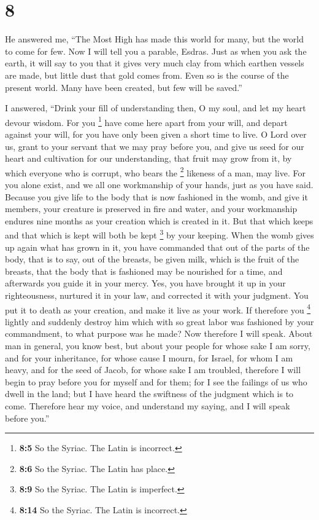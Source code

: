 \hypertarget{section-7}{%
\section{8}\label{section-7}}

 He answered me, ``The Most High has made this world for
many, but the world to come for few.  Now I will tell you
a parable, Esdras. Just as when you ask the earth, it will say to you
that it gives very much clay from which earthen vessels are made, but
little dust that gold comes from. Even so is the course of the present
world.  Many have been created, but few will be saved.''

 I answered, ``Drink your fill of understanding then, O my
soul, and let my heart devour wisdom.  For you \footnote{\textbf{8:5}
  So the Syriac. The Latin is incorrect.} have come here apart from your
will, and depart against your will, for you have only been given a short
time to live.  O Lord over us, grant to your servant that
we may pray before you, and give us seed for our heart and cultivation
for our understanding, that fruit may grow from it, by which everyone
who is corrupt, who bears the \footnote{\textbf{8:6} So the Syriac. The
  Latin has place.} likeness of a man, may live.  For you
alone exist, and we all one workmanship of your hands, just as you have
said.  Because you give life to the body that is now
fashioned in the womb, and give it members, your creature is preserved
in fire and water, and your workmanship endures nine months as your
creation which is created in it.  But that which keeps and
that which is kept will both be kept \footnote{\textbf{8:9} So the
  Syriac. The Latin is imperfect.} by your keeping. When the womb gives
up again what has grown in it,  you have commanded that
out of the parts of the body, that is to say, out of the breasts, be
given milk, which is the fruit of the breasts,  that the
body that is fashioned may be nourished for a time, and afterwards you
guide it in your mercy.  Yes, you have brought it up in
your righteousness, nurtured it in your law, and corrected it with your
judgment.  You put it to death as your creation, and make
it live as your work.  If therefore you \footnote{\textbf{8:14}
  So the Syriac. The Latin is incorrect.} lightly and suddenly destroy
him which with so great labor was fashioned by your commandment, to what
purpose was he made?  Now therefore I will speak. About
man in general, you know best, but about your people for whose sake I am
sorry,  and for your inheritance, for whose cause I
mourn, for Israel, for whom I am heavy, and for the seed of Jacob, for
whose sake I am troubled,  therefore I will begin to pray
before you for myself and for them; for I see the failings of us who
dwell in the land;  but I have heard the swiftness of the
judgment which is to come.  Therefore hear my voice, and
understand my saying, and I will speak before you.''

